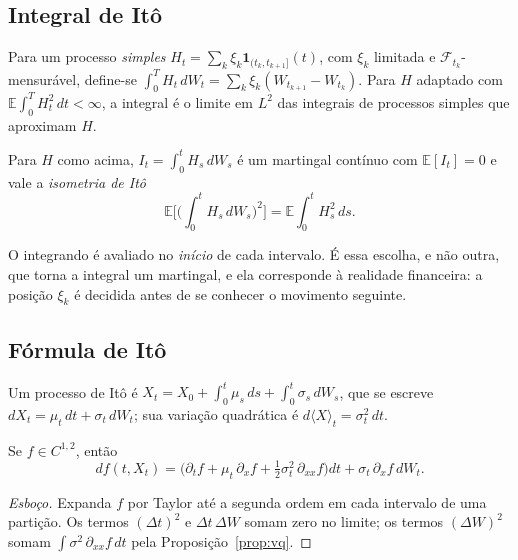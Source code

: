 \subsection{Integral de Itô}

\begin{definicao}
Para um processo \emph{simples} $H_t=\sum_k\xi_k\mathbf 1_{(t_k,t_{k+1}]}(t)$, com $\xi_k$ limitada e $\mathcal F_{t_k}$-mensurável, define-se $\int_0^TH_t\,dW_t=\sum_k\xi_k(W_{t_{k+1}}-W_{t_k})$. Para $H$ adaptado com $\mathbb E\int_0^TH_t^2\,dt<\infty$, a integral é o limite em $L^2$ das integrais de processos simples que aproximam $H$.
\end{definicao}

\begin{teorema}
Para $H$ como acima, $I_t=\int_0^tH_s\,dW_s$ é um martingal contínuo com $\mathbb E[I_t]=0$ e vale a \emph{isometria de Itô}
\begin{equation}
\mathbb E\Big[\Big(\int_0^tH_s\,dW_s\Big)^2\Big]=\mathbb E\int_0^tH_s^2\,ds.
\end{equation}
\end{teorema}

O integrando é avaliado no \emph{início} de cada intervalo. É essa escolha, e não outra, que torna a integral um martingal, e ela corresponde à realidade financeira: a posição $\xi_k$ é decidida antes de se conhecer o movimento seguinte.

\subsection{Fórmula de Itô}

\begin{definicao}
Um processo de Itô é $X_t=X_0+\int_0^t\mu_s\,ds+\int_0^t\sigma_s\,dW_s$, que se escreve $dX_t=\mu_t\,dt+\sigma_t\,dW_t$; sua variação quadrática é $d\langle X\rangle_t=\sigma_t^2\,dt$.
\end{definicao}

\begin{teorema}\label{teo:ito}
Se $f\in C^{1,2}$, então
\begin{equation}\label{eq:ito}
df(t,X_t)=\Big(\partial_tf+\mu_t\,\partial_xf+\tfrac12\sigma_t^2\,\partial_{xx}f\Big)dt+\sigma_t\,\partial_xf\,dW_t.
\end{equation}
\end{teorema}

\begin{proof}[Esboço]
Expanda $f$ por Taylor até a segunda ordem em cada intervalo de uma partição. Os termos $(\Delta t)^2$ e $\Delta t\,\Delta W$ somam zero no limite; os termos $(\Delta W)^2$ somam $\int\sigma^2\,\partial_{xx}f\,dt$ pela Proposição~\ref{prop:vq}.
\end{proof}

